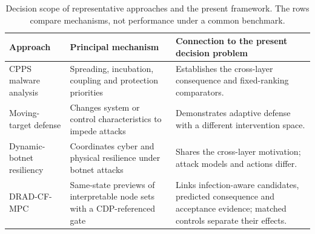 \begin{table}[t]
\centering\small
\caption{Decision scope of representative approaches and the present framework. The rows compare mechanisms, not performance under a common benchmark.}
\label{tab:related_position}
\begin{tabularx}{\textwidth}{p{}p{}X}
\toprule
Approach & Principal mechanism & Connection to the present decision problem\\
\midrule
CPPS malware analysis \cite{xu2020analysis,xu2023resilience,zhang2025robustness} & Spreading, incubation, coupling and protection priorities & Establishes the cross-layer consequence and fixed-ranking comparators.\\
Moving-target defense \cite{cho2020proactive,griffioen2021moving,mohammadpourfard2025adaptive} & Changes system or control characteristics to impede attacks & Demonstrates adaptive defense with a different intervention space.\\
Dynamic-botnet resiliency \cite{zhao2024iotbotnet} & Coordinates cyber and physical resilience under botnet attacks & Shares the cross-layer motivation; attack models and actions differ.\\
DRAD-CF-MPC & Same-state previews of interpretable node sets with a CDP-referenced gate & Links infection-aware candidates, predicted consequence and acceptance evidence; matched controls separate their effects.\\
\bottomrule
\end{tabularx}
\end{table}
